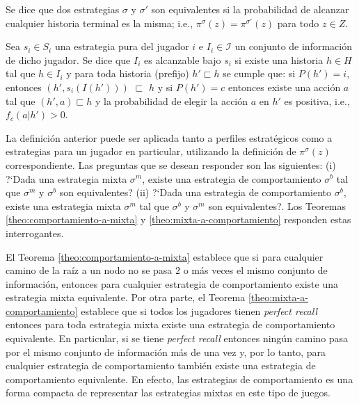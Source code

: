 \begin{definition}
\label{def:equivalencia-estrategias}
Se dice que dos estrategias $\sigma$ y $\sigma'$ son equivalentes si la probabilidad de alcanzar cualquier historia terminal es la misma; i.e., $\pi^\sigma(z) = \pi^{\sigma'}(z)$ para todo $z \in Z$.
\end{definition}

\begin{definition}
\label{def:alcanzabilidad-historia}
Sea $s_i \in S_i$ una estrategia pura del jugador $i$ e $I_i \in \mathcal{I}$ un conjunto de información de dicho jugador. Se dice que $I_i$ es alcanzable bajo $s_i$ si existe una historia $h \in H$ tal que $h \in I_i$ y para toda historia (prefijo) $h' \sqsubset h$ se cumple que: si $P(h') = i$, entonces $(h', s_i(I(h')))$ $\sqsubset$ $h$ y si $P(h') = c$ entonces existe una acción $a$ tal que $(h', a) \sqsubset h$ y la probabilidad de elegir la acción $a$ en $h'$ es positiva, i.e., $f_c(a|h') > 0$. 
\end{definition}

La definición anterior puede ser aplicada tanto a perfiles estratégicos como a estrategias para un jugador en particular, utilizando la definición de $\pi^{\sigma}(z)$ correspondiente. Las preguntas que se desean responder son las siguientes: (i) ?`Dada una estrategia mixta $\sigma^m$, existe una estrategia de comportamiento $\sigma^b$ tal que $\sigma^m$ y $\sigma^b$ son equivalentes? (ii) ?`Dada una estrategia de comportamiento $\sigma^b$, existe una estrategia mixta $\sigma^m$ tal que $\sigma^b$ y $\sigma^m$ son equivalentes?. Los Teoremas \ref{theo:comportamiento-a-mixta} y \ref{theo:mixta-a-comportamiento} responden estas interrogantes.

El Teorema \ref{theo:comportamiento-a-mixta} establece que si para cualquier camino de la raíz a un nodo no se pasa $2$ o más veces el mismo conjunto de información, entonces para cualquier estrategia de comportamiento existe una estrategia mixta equivalente. Por otra parte, el Teorema \ref{theo:mixta-a-comportamiento} establece que si todos los jugadores tienen \textit{perfect recall} entonces para toda estrategia mixta existe una estrategia de comportamiento equivalente. En particular, si se tiene \textit{perfect recall} entonces ningún camino pasa por el mismo conjunto de información más de una vez y, por lo tanto, para cualquier estrategia de comportamiento también existe una estrategia de comportamiento equivalente. En efecto, las estrategias de comportamiento es una forma compacta de representar las estrategias mixtas en este tipo de juegos.

